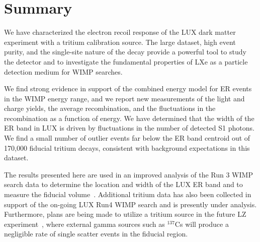 \section{Summary}

We have characterized the electron recoil response of the LUX dark matter experiment with a tritium calibration source. The large dataset, high event purity, and the single-site nature of the decay provide a powerful tool to study the detector and to investigate the fundamental properties of LXe as a particle detection medium for WIMP searches. 

We find strong evidence in support of the combined energy model for ER events in the WIMP energy range, and we report new measurements of the light and charge yields, the average recombination, and the fluctuations in the recombination as a function of energy. We have determined that the width of the ER band in LUX is driven by fluctuations in the number of detected S1 photons. We find a small number of outlier events far below the ER band centroid out of 170,000 fiducial tritium decays, consistent with background expectations in this dataset.

The results presented here are used in an improved analysis of the Run 3 WIMP search data to determine the location and width of the LUX ER band and to measure the fiducial volume~\cite{lux-reanalysis}. Additional tritium data has also been collected in support of the on-going LUX Run4 WIMP search and is presently under analysis. Furthermore, plans are being made to utilize a tritium source in the future LZ experiment~\cite{lz-cdr}, where external gamma sources such as $^{137}$Cs will produce a negligible rate of single scatter events in the fiducial region.